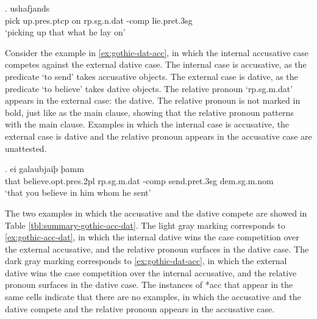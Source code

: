 \exg. ushafjands    \\
{pick up}.\ac{pres}.\ac{ptcp}\scsub{[acc]} on\scsub{[dat]} \ac{rp}.\ac{sg}.\ac{n}.\ac{dat} -\ac{comp} lie.\ac{pret}.3\ac{sg}\\
`picking up that what he lay on' \label{ex:gothic-acc-dat}

Consider the example in \ref{ex:gothic-dat-acc}, in which the internal accusative case competes against the external dative case.
The internal case is accusative, as the predicate  `to send' takes accusative objects.
The external case is dative, as the predicate  `to believe' takes dative objects.
The relative pronoun  `\ac{rp}.\ac{sg}.\ac{m}.\ac{dat}' appears in the external case: the dative. The relative pronoun is not marked in bold, just like as the main clause, showing that the relative pronoun patterns with the main clause.
Examples in which the internal case is accusative, the external case is dative and the relative pronoun appears in the accusative case are unattested.

\exg. ei galaubjaiþ þamm   \\
that believe.\ac{opt}.\ac{pres}.2\ac{pl}\scsub{[dat]} \ac{rp}.\ac{sg}.\ac{m}.\ac{dat} -\ac{comp} {send}.\ac{pret}.3\ac{sg}\scsub{[acc]} \ac{dem}.\ac{sg}.\ac{m}.\ac{nom}\\
`that you believe in him whom he sent' \label{ex:gothic-dat-acc}

The two examples in which the accusative and the dative compete are showed in Table \ref{tbl:summary-gothic-acc-dat}. The light gray marking corresponds to \ref{ex:gothic-acc-dat}, in which the internal dative wins the case competition over the external accusative, and the relative pronoun surfaces in the dative case. The dark gray marking corresponds to \ref{ex:gothic-dat-acc}, in which the external dative wins the case competition over the internal accusative, and the relative pronoun surfaces in the dative case. The instances of *\ac{acc} that appear in the same cells indicate that there are no examples, in which the accusative and the dative compete and the relative pronoun appears in the accusative case.

